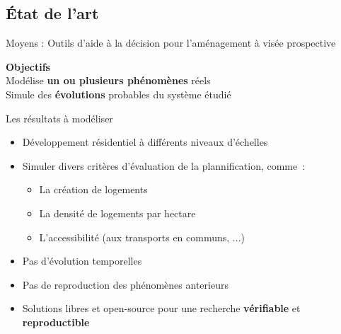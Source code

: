 \documentclass[xcolor=table]{beamer}
\begin{document}
\subsection{État de l'art}
\begin{frame}{Moyens : Outils d'aide à la décision pour l'aménagement à visée prospective}
\begin{block}{}
	\textbf{Objectifs}\\
	Modélise \textbf{un ou plusieurs phénomènes} réels\\
	Simule des \textbf{évolutions} probables du système étudié\\
\end{block}
\end{frame}

\begin{frame}{Les résultats à modéliser}
	\begin{itemize}
		\item<1-> Développement résidentiel à différents niveaux d'échelles
		\item<2-> Simuler divers critères d'évaluation de la plannification, comme~:
	\begin{itemize}	
			\item<3-> La création de logements
			\item<4-> La densité de logements par hectare
			\item<5-> L'accessibilité (aux transports en communs, ...)
		\end{itemize}
		\item<6-> Pas d'évolution temporelles
		\item<6-> Pas de reproduction des phénomènes anterieurs
		\item<7-> Solutions libres et open-source pour une recherche \textbf{vérifiable} et \textbf{reproductible}
	\end{itemize}
\end{frame}
\end{document}
